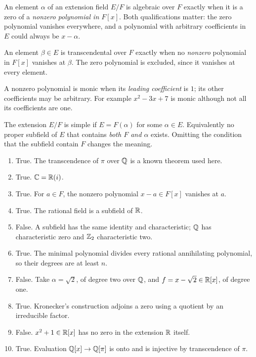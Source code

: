 An element $\alpha$ of an extension field $E/F$ is algebraic over $F$ exactly when it is a zero of a \emph{nonzero polynomial in $F[x]$}. Both qualifications matter: the zero polynomial vanishes everywhere, and a polynomial with arbitrary coefficients in $E$ could always be $x-\alpha$.

An element $\beta\in E$ is transcendental over $F$ exactly when no \emph{nonzero} polynomial in $F[x]$ vanishes at $\beta$. The zero polynomial is excluded, since it vanishes at every element.

A nonzero polynomial is monic when its \emph{leading coefficient} is $1$; its other coefficients may be arbitrary. For example $x^2-3x+7$ is monic although not all its coefficients are one.

The extension $E/F$ is simple if $E=F(\alpha)$ for some $\alpha\in E$. Equivalently no proper subfield of $E$ that contains \emph{both $F$ and $\alpha$} exists. Omitting the condition that the subfield contain $F$ changes the meaning.

\begin{enumerate}[label=(\alph*)]
\item True. The transcendence of $\pi$ over $\mathbb{Q}$ is a known theorem used here.
\item True. $\mathbb{C}=\mathbb{R}(i)$.
\item True. For $a\in F$, the nonzero polynomial $x-a\in F[x]$ vanishes at $a$.
\item True. The rational field is a subfield of $\mathbb{R}$.
\item False. A subfield has the same identity and characteristic; $\mathbb{Q}$ has characteristic zero and $\mathbb{Z}_2$ characteristic two.
\item True. The minimal polynomial divides every rational annihilating polynomial, so their degrees are at least $n$.
\item False. Take $\alpha=\sqrt2$, of degree two over $\mathbb{Q}$, and $f=x-\sqrt2\in\mathbb{R}[x]$, of degree one.
\item True. Kronecker's construction adjoins a zero using a quotient by an irreducible factor.
\item False. $x^2+1\in\mathbb{R}[x]$ has no zero in the extension $\mathbb{R}$ itself.
\item True. Evaluation $\mathbb{Q}[x]\to\mathbb{Q}[\pi]$ is onto and is injective by transcendence of $\pi$.
\end{enumerate}

